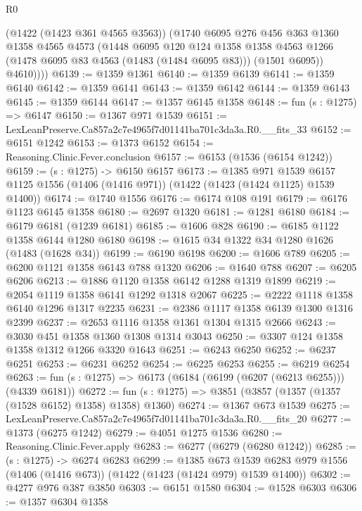 \begin{lexlean}{R0}
\begin{coremodule}
          (@1422 (@1423 @361 @4565 @3563))
          (@1740
            @6095
            @276
            @456
            @363
            @1360
            @1358
            @4565
            @4573
            (@1448
              @6095
              @120
              @124
              @1358
              @1358
              @4563
              @1266
              (@1478 @6095 @83 @4563 (@1483 (@1484 @6095 @83)))
              (@1501 @6095))
            @4610))))
@6139 := @1359 @1361
@6140 := @1359 @6139
@6141 := @1359 @6140
@6142 := @1359 @6141
@6143 := @1359 @6142
@6144 := @1359 @6143
@6145 := @1359 @6144
@6147 := @1357 @6145 @1358
@6148 := fun (s : @1275) => @6147
@6150 := @1367 @971 @1539
@6151 := LexLeanPreserve.Ca857a2c7e4965f7d01141ba701c3da3a.R0.__fits_33
@6152 := @6151 @1242
@6153 := @1373 @6152
@6154 := Reasoning.Clinic.Fever.conclusion
@6157 := @6153 (@1536 (@6154 @1242))
@6159 := (s : @1275) -> @6150 @6157
@6173 := @1385
    @971
    @1539
    @6157
    @1125
    @1556
    (@1406 (@1416 @971))
    (@1422 (@1423 (@1424 @1125) @1539 @1400))
@6174 := @1740 @1556
@6176 := @6174 @108 @191
@6179 := @6176 @1123 @6145 @1358
@6180 := @2697 @1320
@6181 := @1281 @6180
@6184 := @6179 @6181 (@1239 @6181)
@6185 := @1606 @828
@6190 := @6185 @1122 @1358 @6144 @1280 @6180
@6198 := @1615 @34 @1322 @34 @1280 @1626 (@1483 (@1628 @34))
@6199 := @6190 @6198
@6200 := @1606 @789
@6205 := @6200 @1121 @1358 @6143 @788 @1320
@6206 := @1640 @788
@6207 := @6205 @6206
@6213 := @1886 @1120 @1358 @6142 @1288 @1319 @1899
@6219 := @2054 @1119 @1358 @6141 @1292 @1318 @2067
@6225 := @2222 @1118 @1358 @6140 @1296 @1317 @2235
@6231 := @2386 @1117 @1358 @6139 @1300 @1316 @2399
@6237 := @2653 @1116 @1358 @1361 @1304 @1315 @2666
@6243 := @3030 @451 @1358 @1360 @1308 @1314 @3043
@6250 := @3307 @124 @1358 @1358 @1312 @1266 @3320 @1643
@6251 := @6243 @6250
@6252 := @6237 @6251
@6253 := @6231 @6252
@6254 := @6225 @6253
@6255 := @6219 @6254
@6263 := fun (s : @1275) => @6173 (@6184 (@6199 (@6207 (@6213 @6255))) (@4339 @6181))
@6272 := fun (s : @1275) => @3851 (@3857 (@1357 (@1357 (@1528 @6152) @1358) @1358) @1360)
@6274 := @1367 @673 @1539
@6275 := LexLeanPreserve.Ca857a2c7e4965f7d01141ba701c3da3a.R0.__fits_20
@6277 := @1373 (@6275 @1242)
@6279 := @4051 @1275 @1536
@6280 := Reasoning.Clinic.Fever.apply
@6283 := @6277 (@6279 (@6280 @1242))
@6285 := (s : @1275) -> @6274 @6283
@6299 := @1385
    @673
    @1539
    @6283
    @979
    @1556
    (@1406 (@1416 @673))
    (@1422 (@1423 (@1424 @979) @1539 @1400))
@6302 := @4277 @976 @387 @3850
@6303 := @6151 @1580
@6304 := @1528 @6303
@6306 := @1357 @6304 @1358

\end{coremodule}
\end{lexlean}
